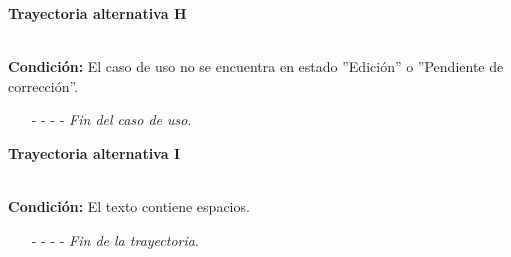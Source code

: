 \hypertarget{CU12-1-6-1:TAH}{\textbf{Trayectoria alternativa H}}\\
\noindent \textbf{Condición:} El caso de uso no se encuentra en estado ''Edición'' o ''Pendiente de corrección''.
\begin{enumerate}
	\UCpaso[\UCsist]  Oculta el botón  del caso que no se encuentra en estado de ''Edición'' o ''Pendiente de corrección''.
	\item[- -] - - {\em {Fin del caso de uso}}.
\end{enumerate}
\hypertarget{CU12-1-6-1:TAI}{\textbf{Trayectoria alternativa I}}\\
\noindent \textbf{Condición:} El texto contiene espacios.
\begin{enumerate}
	\UCpaso[\UCsist] Sustituye los espacios por guiones bajos.
	\UCpaso Continua en el paso \ref{CU12.1.6.1-TA6} de la trayectoria alternativa A.
	\item[- -] - - {\em {Fin de la trayectoria}}.
\end{enumerate}

